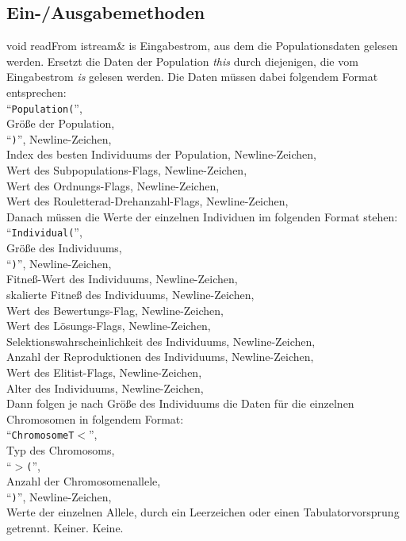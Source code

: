 \documentclass{report}
\begin{document}
\newpage

\subsection{Ein-/Ausgabemethoden}

\setNormalInstance
\printMethodWithOneParam
{void}
{readFrom}
{istream\&}
{is}
{Eingabestrom, aus dem die Populationsdaten gelesen
                         werden.}
{Ersetzt die Daten der Population {\em this} durch diejenigen, die vom Eingabestrom
    {\em is} gelesen werden. Die Daten m\"ussen dabei folgendem Format entsprechen:\\
    ``{\tt Population(}'',\\
    Gr\"o{\ss}e der Population,\\
    ``{\tt )}'', Newline-Zeichen,\\
    Index des besten Individuums der Population, Newline-Zeichen,\\
    Wert des Subpopulations-Flags, Newline-Zeichen,\\
    Wert des Ordnungs-Flags, Newline-Zeichen,\\
    Wert des Rouletterad-Drehanzahl-Flags, Newline-Zeichen,\\
    Danach m\"ussen die Werte der einzelnen Individuen im folgenden
    Format stehen:\\
    ``{\tt Individual(}'',\\
    Gr\"o{\ss}e des Individuums,\\ 
    ``{\tt )}'', Newline-Zeichen,\\ 
    Fitne{\ss}-Wert des Individuums, Newline-Zeichen,\\
    skalierte Fitne{\ss} des Individuums, Newline-Zeichen,\\
    Wert des Bewertungs-Flag, Newline-Zeichen,\\
    Wert des L\"osungs-Flags, Newline-Zeichen,\\
    Selektionswahrscheinlichkeit des Individuums, Newline-Zeichen,\\
    Anzahl der Reproduktionen des Individuums, Newline-Zeichen,\\
    Wert des Elitist-Flags, Newline-Zeichen,\\
    Alter des Individuums, Newline-Zeichen,\\
    Dann folgen je nach Gr\"o{\ss}e des Individuums die Daten f\"ur die 
    einzelnen Chromosomen in folgendem Format:\\
    ``{\tt ChromosomeT$<$}'',\\
    Typ des Chromosoms,\\ 
    ``{\tt $>$(}'',\\ 
    Anzahl der Chromosomenallele,\\
    ``{\tt )}'', Newline-Zeichen,\\
    Werte der einzelnen Allele, durch ein Leerzeichen oder einen
    Tabulatorvorsprung getrennt.}
{Keiner.}
{Keine.}
\end{document}
